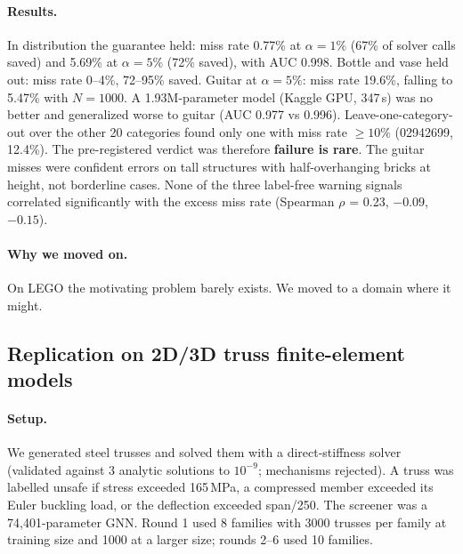\paragraph{Results.} In distribution the guarantee held: miss rate 0.77\% at $\alpha{=}1\%$ (67\% of solver calls saved) and 5.69\% at $\alpha{=}5\%$ (72\% saved), with AUC 0.998. Bottle and vase held out: miss rate 0--4\%, 72--95\% saved. Guitar at $\alpha{=}5\%$: miss rate 19.6\%, falling to 5.47\% with $N{=}1000$. A 1.93M-parameter model (Kaggle GPU, 347\,s) was no better and generalized worse to guitar (AUC 0.977 vs 0.996). Leave-one-category-out over the other 20 categories found only one with miss rate $\geq 10\%$ (02942699, 12.4\%). The pre-registered verdict was therefore \textbf{failure is rare}. The guitar misses were confident errors on tall structures with half-overhanging bricks at height, not borderline cases. None of the three label-free warning signals correlated significantly with the excess miss rate (Spearman $\rho$ = 0.23, $-0.09$, $-0.15$).

\paragraph{Why we moved on.} On LEGO the motivating problem barely exists. We moved to a domain where it might.

\subsection{Replication on 2D/3D truss finite-element models}
\label{ex:truss}
\paragraph{Setup.} We generated steel trusses and solved them with a direct-stiffness solver (validated against 3 analytic solutions to $10^{-9}$; mechanisms rejected). A truss was labelled unsafe if stress exceeded 165\,MPa, a compressed member exceeded its Euler buckling load, or the deflection exceeded span/250. The screener was a 74{,}401-parameter GNN. Round 1 used 8 families with 3000 trusses per family at training size and 1000 at a larger size; rounds 2--6 used 10 families.

